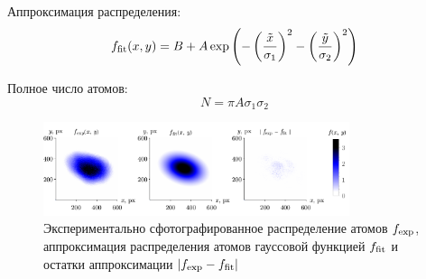 \begin{minipage}{0.6\textwidth}

Аппроксимация распределения:
\begin{equation*}
    f_{\textnormal{fit}}(x, y) = B+A \exp\left(
        - \left(\frac{\tilde{x}}{\sigma_1}\right)^2 - \left(\frac{\tilde{y}}{\sigma_2}\right)^2
    \right)
\end{equation*}


\end{minipage}
\hfill
\begin{minipage}{0.31\textwidth}

Полное число атомов:
\begin{equation*}
\boxed{
	N = \pi A \sigma_1 \sigma_2
}
\end{equation*}

\end{minipage}


\begin{figure}[h]
    \centering
    \includegraphics[width=0.8\textwidth]{../MOT/figs/fit_mot_v2.pdf}
    \caption{Экспериментально сфотографированное распределение атомов $f_{\textnormal{exp}}$, аппроксимация распределения атомов гауссовой функцией $f_{\textnormal{fit}}$ и остатки аппроксимации $|f_{\textnormal{exp}} - f_{\textnormal{fit}}|$}
\end{figure}
